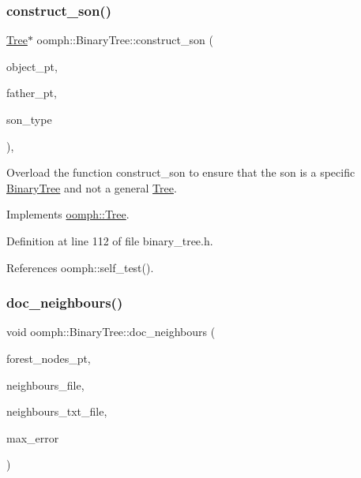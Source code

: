\subsubsection{\texorpdfstring{construct\+\_\+son()}{construct\_son()}}
{\footnotesize\ttfamily \hyperlink{classoomph_1_1Tree}{Tree}$\ast$ oomph\+::\+Binary\+Tree\+::construct\+\_\+son (\begin{DoxyParamCaption}\item[{\hyperlink{classoomph_1_1RefineableElement}{Refineable\+Element} $\ast$const \&}]{object\+\_\+pt,  }\item[{\hyperlink{classoomph_1_1Tree}{Tree} $\ast$const \&}]{father\+\_\+pt,  }\item[{const int \&}]{son\+\_\+type }\end{DoxyParamCaption})\hspace{0.3cm}{\ttfamily [inline]}, {\ttfamily [virtual]}}



Overload the function construct\+\_\+son to ensure that the son is a specific \hyperlink{classoomph_1_1BinaryTree}{Binary\+Tree} and not a general \hyperlink{classoomph_1_1Tree}{Tree}. 



Implements \hyperlink{classoomph_1_1Tree_a5eb29718044b1bc56403ee9bd15a60b6}{oomph\+::\+Tree}.



Definition at line 112 of file binary\+\_\+tree.\+h.



References oomph\+::self\+\_\+test().

\mbox{\label{classoomph_1_1BinaryTree_a2f8250c7ab624c28a1f64c89f9b4b2af}} 
\subsubsection{\texorpdfstring{doc\+\_\+neighbours()}{doc\_neighbours()}}
{\footnotesize\ttfamily void oomph\+::\+Binary\+Tree\+::doc\+\_\+neighbours (\begin{DoxyParamCaption}\item[{\hyperlink{classoomph_1_1Vector}{Vector}$<$ \hyperlink{classoomph_1_1Tree}{Tree} $\ast$$>$}]{forest\+\_\+nodes\+\_\+pt,  }\item[{std\+::ofstream \&}]{neighbours\+\_\+file,  }\item[{std\+::ofstream \&}]{neighbours\+\_\+txt\+\_\+file,  }\item[{double \&}]{max\+\_\+error }\end{DoxyParamCaption})\hspace{0.3cm}{\ttfamily [static]}}



